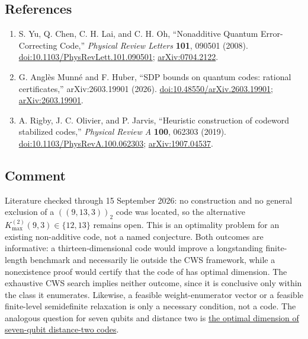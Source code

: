 \subsection*{References}

\begin{enumerate}[label={},leftmargin=4.8em,labelsep=0.5em]
  \footnotesize
  \item[\textup{[YCLO08]}]\label{ref:0d6a-yclo}
  S. Yu, Q. Chen, C. H. Lai, and C. H. Oh, ``Nonadditive Quantum Error-Correcting Code,'' \emph{Physical Review Letters} \textbf{101}, 090501 (2008). \href{https://doi.org/10.1103/PhysRevLett.101.090501}{doi:10.1103/PhysRevLett.101.090501}; \href{https://arxiv.org/abs/0704.2122}{arXiv:0704.2122}.

  \item[\textup{[AMH26]}]\label{ref:0d6a-amh}
  G. Angl\`es Munn\'e and F. Huber, ``SDP bounds on quantum codes: rational certificates,'' arXiv:2603.19901 (2026). \href{https://doi.org/10.48550/arXiv.2603.19901}{doi:10.48550/arXiv.2603.19901}; \href{https://arxiv.org/abs/2603.19901}{arXiv:2603.19901}.

  \item[\textup{[ROJ19]}]\label{ref:0d6a-roj}
  A. Rigby, J. C. Olivier, and P. Jarvis, ``Heuristic construction of codeword stabilized codes,'' \emph{Physical Review A} \textbf{100}, 062303 (2019). \href{https://doi.org/10.1103/PhysRevA.100.062303}{doi:10.1103/PhysRevA.100.062303}; \href{https://arxiv.org/abs/1907.04537}{arXiv:1907.04537}.
\end{enumerate}

\subsection*{Comment}

Literature checked through 15 September 2026: no construction and no general
exclusion of a $((9,13,3))_2$ code was located, so the alternative
$K_{\max}^{(2)}(9,3)\in\{12,13\}$ remains open.  This is an optimality problem for
an existing non-additive code, not a named conjecture.  Both outcomes are
informative: a thirteen-dimensional code would improve a longstanding
finite-length benchmark and necessarily lie outside the CWS framework, while a
nonexistence proof would certify that the code of
 has optimal dimension.  The exhaustive CWS
search implies neither outcome, since it is conclusive only within the class it
enumerates.  Likewise, a feasible weight-enumerator vector or a feasible
finite-level semidefinite relaxation is only a necessary condition, not a code.
The analogous question for seven qubits and distance two is
\href{https://qiqc-op.com/problem/op_5ea7cb9abb281829/}{the optimal dimension of
seven-qubit distance-two codes}.


